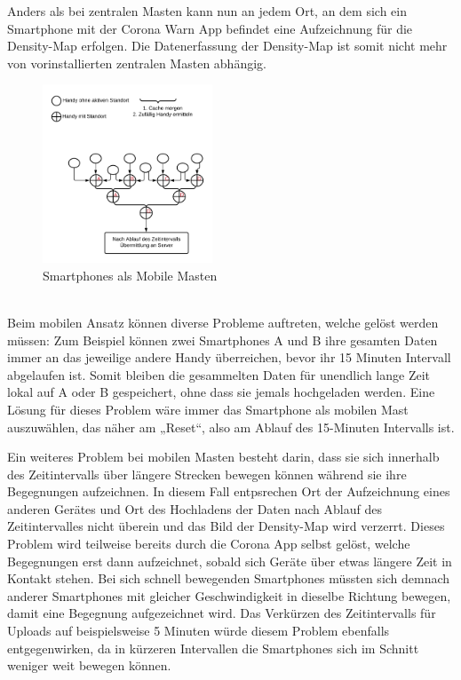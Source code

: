 \documentclass[conference]{IEEEtran}
\begin{document}
Anders als bei zentralen Masten kann nun an jedem Ort, an dem sich ein Smartphone mit der Corona Warn App befindet eine Aufzeichnung für die Density-Map erfolgen. 
Die Datenerfassung der Density-Map ist somit nicht mehr von vorinstallierten zentralen Masten abhängig.\\
\begin{figure}[h]
	\centering
	\includegraphics[width=0.45\textwidth]{"Mobile_Mast"}
	\caption{Smartphones als Mobile Masten}
	\label{mobile_mast}
\end{figure} \\
Beim mobilen Ansatz können diverse Probleme auftreten, welche gelöst werden müssen: Zum Beispiel können zwei Smartphones A und B ihre gesamten Daten immer an das jeweilige andere Handy überreichen, bevor ihr 15 Minuten Intervall abgelaufen ist. 
Somit bleiben die gesammelten Daten für unendlich lange Zeit lokal auf A oder B gespeichert, ohne dass sie jemals hochgeladen werden. 
Eine Lösung für dieses Problem wäre immer das Smartphone als mobilen Mast auszuwählen, das näher am „Reset“, also am Ablauf des 15-Minuten Intervalls ist.

Ein weiteres Problem bei mobilen Masten besteht darin, dass sie sich innerhalb des Zeitintervalls über längere Strecken bewegen können während sie ihre Begegnungen aufzeichnen.
In diesem Fall entpsrechen Ort der Aufzeichnung eines anderen Gerätes und Ort des Hochladens der Daten nach Ablauf des Zeitintervalles nicht überein und das Bild der Density-Map wird verzerrt. 
Dieses Problem wird teilweise bereits durch die Corona App selbst gelöst, welche Begegnungen erst dann aufzeichnet, sobald sich Geräte über etwas längere Zeit in Kontakt stehen. 
Bei sich schnell bewegenden Smartphones müssten sich demnach anderer Smartphones mit gleicher Geschwindigkeit in dieselbe Richtung bewegen, damit eine Begegnung aufgezeichnet wird. 
Das Verkürzen des Zeitintervalls für Uploads auf beispielsweise 5 Minuten würde diesem Problem ebenfalls entgegenwirken, da in kürzeren Intervallen die Smartphones sich im Schnitt weniger weit bewegen können.
\end{document}
